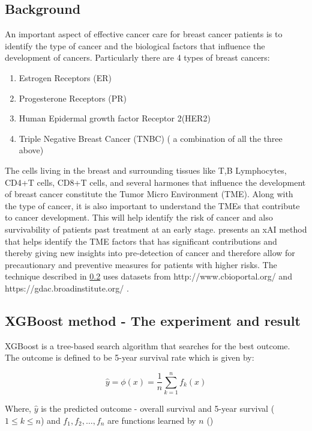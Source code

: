 \documentclass[sigconf, language=english]{acmart}
\begin{document}
\subsection{Background}

An important aspect of effective cancer care for breast cancer patients is to identify the type of cancer and the biological factors that influence the development of cancers. Particularly there are 4 types of breast cancers:
\begin{enumerate}
\item Estrogen Receptors (ER)
\item Progesterone Receptors (PR)
\item Human Epidermal growth factor Receptor 2(HER2)
\item Triple Negative Breast Cancer (TNBC) ( a combination of all the three above)
\end{enumerate}

The cells living in the breast and surrounding tissues like T,B Lymphocytes, CD4+T cells, CD8+T cells, and several harmones that influence the development of breast cancer constitute the Tumor Micro Environment (TME). Along with the type of cancer, it is also important to understand the TMEs that contribute to cancer development. This will help identify the risk of cancer and also survivability of patients past treatment at an early stage. 
\cite{cancers2021} presents an xAI method that helps identify the TME factors that has significant contributions and thereby giving new insights into pre-detection of cancer and therefore allow for precautionary and preventive measures for patients with higher risks. The technique described in \ref{xgboost} uses datasets from http://www.cbioportal.org/ and https://gdac.broadinstitute.org/ .

\subsection{XGBoost method - The experiment and result}
\label{xgboost}
XGBoost is a tree-based search algorithm that searches for the best outcome. The outcome is defined to be 5-year survival rate which is given by:

\begin{equation}
\hat{y} = \phi(x) = \frac{1}{n}\sum_{k=1}^{n}f_k(x)
\end{equation}

Where, \(\hat{y}\) is the predicted outcome - overall survival and 5-year survival (\(1\leq{k}\leq{n}\)) and \(f_1, f_2, \ldots, f_n\) are functions learned by \(n\)
(\cite{cancers2021})
\end{document}

